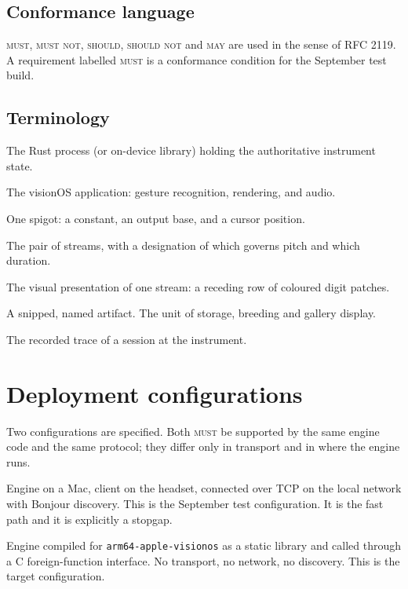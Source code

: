 \documentclass[11pt,a4paper]{article}
\newcommand{\MUST}{\textsc{must}}
\newcommand{\MUSTNOT}{\textsc{must not}}
\newcommand{\SHOULD}{\textsc{should}}
\newcommand{\SHOULDNOT}{\textsc{should not}}
\newcommand{\MAY}{\textsc{may}}
\theoremstyle{definition}
\theoremstyle{plain}
\theoremstyle{remark}
\begin{document}
\subsection{Conformance language}

\MUST, \MUSTNOT, \SHOULD, \SHOULDNOT{} and \MAY{} are used in the sense of RFC 2119. A requirement
labelled \MUST{} is a conformance condition for the September test build.

\subsection{Terminology}

\begin{description}[leftmargin=2.2cm,style=nextline,font=\normalfont\itshape]
\item[Engine] The Rust process (or on-device library) holding the authoritative instrument state.
\item[Client] The visionOS application: gesture recognition, rendering, and audio.
\item[Stream] One spigot: a constant, an output base, and a cursor position.
\item[Skein] The pair of streams, with a designation of which governs pitch and which duration.
\item[Ribbon] The visual presentation of one stream: a receding row of coloured digit patches.
\item[Tune] A snipped, named artifact. The unit of storage, breeding and gallery display.
\item[Performance] The recorded trace of a session at the instrument.
\end{description}

\section{Deployment configurations}

Two configurations are specified. Both \MUST{} be supported by the same engine code and the same
protocol; they differ only in transport and in where the engine runs.

\begin{description}[leftmargin=1cm,style=nextline]
\item[\textbf{S1 --- Tethered.}] Engine on a Mac, client on the headset, connected over TCP on the
local network with Bonjour discovery. This is the September test configuration. It is the fast path
and it is explicitly a stopgap.
\item[\textbf{S2 --- On-device.}] Engine compiled for \texttt{arm64-apple-visionos} as a static
library and called through a C foreign-function interface. No transport, no network, no discovery.
This is the target configuration.
\end{description}
\end{document}
